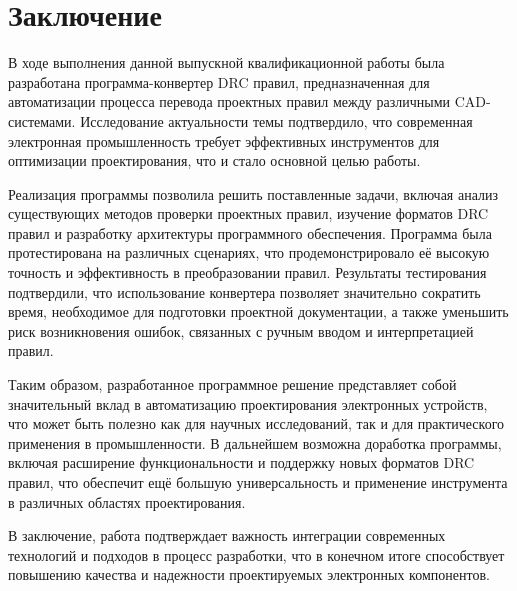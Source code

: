 \chapter*{Заключение}

В ходе выполнения данной выпускной квалификационной работы
была разработана программа-конвертер DRC правил,
предназначенная для автоматизации процесса перевода проектных правил
между различными CAD-системами.
Исследование актуальности темы подтвердило,
что современная электронная промышленность требует
эффективных инструментов для оптимизации проектирования,
что и стало основной целью работы.

Реализация программы позволила решить поставленные задачи,
включая анализ существующих методов проверки проектных правил,
изучение форматов DRC правил и разработку архитектуры программного обеспечения.
Программа была протестирована на различных сценариях,
что продемонстрировало её высокую точность
и эффективность в преобразовании правил.
Результаты тестирования подтвердили,
что использование конвертера позволяет значительно сократить время,
необходимое для подготовки проектной документации,
а также уменьшить риск возникновения ошибок,
связанных с ручным вводом и интерпретацией правил.

Таким образом, разработанное программное решение представляет
собой значительный вклад в автоматизацию проектирования электронных устройств,
что может быть полезно как для научных исследований,
так и для практического применения в промышленности.
В дальнейшем возможна доработка программы,
включая расширение функциональности и поддержку новых форматов DRC правил,
что обеспечит ещё большую универсальность
и применение инструмента в различных областях проектирования.

В заключение, работа подтверждает важность интеграции современных технологий
и подходов в процесс разработки,
что в конечном итоге способствует повышению качества
и надежности проектируемых электронных компонентов.

